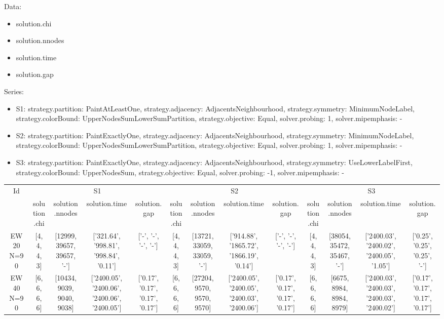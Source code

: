 \documentclass[landscape, 12pt]{report}
\begin{document}
Data:
\begin{itemize}
\item solution.chi
\item solution.nnodes
\item solution.time
\item solution.gap
\end{itemize}
Series:
\begin{itemize}
\item S1: strategy.partition: PaintAtLeastOne, strategy.adjacency: AdjacentsNeighbourhood, strategy.symmetry: MinimumNodeLabel, strategy.colorBound: UpperNodesSumLowerSumPartition, strategy.objective: Equal, solver.probing: 1, solver.mipemphasis: -
\item S2: strategy.partition: PaintExactlyOne, strategy.adjacency: AdjacentsNeighbourhood, strategy.symmetry: MinimumNodeLabel, strategy.colorBound: UpperNodesSumLowerSumPartition, strategy.objective: Equal, solver.probing: 1, solver.mipemphasis: -
\item S3: strategy.partition: PaintExactlyOne, strategy.adjacency: AdjacentsNeighbourhood, strategy.symmetry: UseLowerLabelFirst, strategy.colorBound: UpperNodesSum, strategy.objective: Equal, solver.probing: -1, solver.mipemphasis: -
\end{itemize}
\begin{tabular}{|c|cccc|cccc|cccc|}
\hline
\multicolumn{1}{|c|}{Id} & \multicolumn{4}{|c|}{S1} & \multicolumn{4}{|c|}{S2} & \multicolumn{4}{|c|}{S3}
\\
 & solution.chi & solution.nnodes & solution.time & solution.gap & solution.chi & solution.nnodes & solution.time & solution.gap & solution.chi & solution.nnodes & solution.time & solution.gap
\\
\hline
EW 20 N=90 & [4, 4, 4, 3] & [12999, 39657, 39657, '-'] & ['321.64', '998.81', '998.84', '0.11'] & ['-', '-', '-', '-'] & [4, 4, 4, 3] & [13721, 33059, 33059, '-'] & ['914.88', '1865.72', '1866.19', '0.14'] & ['-', '-', '-', '-'] & [4, 4, 4, 3] & [38054, 35472, 35467, '-'] & ['2400.03', '2400.02', '2400.05', '1.05'] & ['0.25', '0.25', '0.25', '-']
\\
EW 40 N=90 & [6, 6, 6, 6] & [10434, 9039, 9040, 9038] & ['2400.05', '2400.06', '2400.06', '2400.05'] & ['0.17', '0.17', '0.17', '0.17'] & [6, 6, 6, 6] & [27204, 9570, 9570, 9570] & ['2400.05', '2400.05', '2400.03', '2400.06'] & ['0.17', '0.17', '0.17', '0.17'] & [6, 6, 6, 6] & [6675, 8984, 8984, 8979] & ['2400.03', '2400.03', '2400.03', '2400.02'] & ['0.17', '0.17', '0.17', '0.17']
\\
\hline 
 \end{tabular}
 
\end{document}

